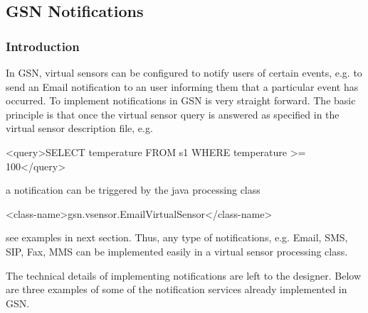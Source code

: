 \subsection{GSN Notifications}

\subsubsection{Introduction}

In GSN, virtual sensors can be configured to notify users of certain events, e.g. to send an Email notification to an user informing them that a particular event has occurred. To implement notifications in GSN is very straight forward. The basic principle is that once the virtual sensor query is answered as specified in the virtual sensor description file, e.g.

\begin{xmlcode}
<query>SELECT temperature FROM s1 WHERE temperature >= 100</query>
\end{xmlcode}

a notification can be triggered  by the java processing class

\begin{xmlcode}
<class-name>gsn.vsensor.EmailVirtualSensor</class-name>
\end{xmlcode}

see examples in next section. Thus, any type of notifications, e.g. Email, SMS, SIP, Fax, MMS can be implemented easily in a virtual sensor processing class. 

The technical details of implementing notifications are left to the designer. Below are three examples of some of the notification services already implemented in GSN.






